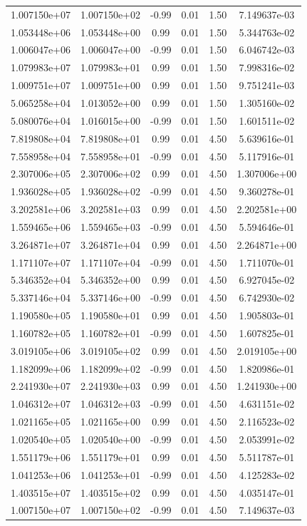 \documentclass{article}
\begin{document}
\begin{table}[htbp]
\begin{tabular}{cccccc}
1.007150e+07 & 1.007150e+02 & -0.99 & 0.01 & 1.50 & 7.149637e-03 \\
1.053448e+06 & 1.053448e+00 & 0.99 & 0.01 & 1.50 & 5.344763e-02 \\
1.006047e+06 & 1.006047e+00 & -0.99 & 0.01 & 1.50 & 6.046742e-03 \\
1.079983e+07 & 1.079983e+01 & 0.99 & 0.01 & 1.50 & 7.998316e-02 \\
1.009751e+07 & 1.009751e+00 & 0.99 & 0.01 & 1.50 & 9.751241e-03 \\
5.065258e+04 & 1.013052e+00 & 0.99 & 0.01 & 1.50 & 1.305160e-02 \\
5.080076e+04 & 1.016015e+00 & -0.99 & 0.01 & 1.50 & 1.601511e-02 \\
7.819808e+04 & 7.819808e+01 & 0.99 & 0.01 & 4.50 & 5.639616e-01 \\
7.558958e+04 & 7.558958e+01 & -0.99 & 0.01 & 4.50 & 5.117916e-01 \\
2.307006e+05 & 2.307006e+02 & 0.99 & 0.01 & 4.50 & 1.307006e+00 \\
1.936028e+05 & 1.936028e+02 & -0.99 & 0.01 & 4.50 & 9.360278e-01 \\
3.202581e+06 & 3.202581e+03 & 0.99 & 0.01 & 4.50 & 2.202581e+00 \\
1.559465e+06 & 1.559465e+03 & -0.99 & 0.01 & 4.50 & 5.594646e-01 \\
3.264871e+07 & 3.264871e+04 & 0.99 & 0.01 & 4.50 & 2.264871e+00 \\
1.171107e+07 & 1.171107e+04 & -0.99 & 0.01 & 4.50 & 1.711070e-01 \\
5.346352e+04 & 5.346352e+00 & 0.99 & 0.01 & 4.50 & 6.927045e-02 \\
5.337146e+04 & 5.337146e+00 & -0.99 & 0.01 & 4.50 & 6.742930e-02 \\
1.190580e+05 & 1.190580e+01 & 0.99 & 0.01 & 4.50 & 1.905803e-01 \\
1.160782e+05 & 1.160782e+01 & -0.99 & 0.01 & 4.50 & 1.607825e-01 \\
3.019105e+06 & 3.019105e+02 & 0.99 & 0.01 & 4.50 & 2.019105e+00 \\
1.182099e+06 & 1.182099e+02 & -0.99 & 0.01 & 4.50 & 1.820986e-01 \\
2.241930e+07 & 2.241930e+03 & 0.99 & 0.01 & 4.50 & 1.241930e+00 \\
1.046312e+07 & 1.046312e+03 & -0.99 & 0.01 & 4.50 & 4.631151e-02 \\
1.021165e+05 & 1.021165e+00 & 0.99 & 0.01 & 4.50 & 2.116523e-02 \\
1.020540e+05 & 1.020540e+00 & -0.99 & 0.01 & 4.50 & 2.053991e-02 \\
1.551179e+06 & 1.551179e+01 & 0.99 & 0.01 & 4.50 & 5.511787e-01 \\
1.041253e+06 & 1.041253e+01 & -0.99 & 0.01 & 4.50 & 4.125283e-02 \\
1.403515e+07 & 1.403515e+02 & 0.99 & 0.01 & 4.50 & 4.035147e-01 \\
1.007150e+07 & 1.007150e+02 & -0.99 & 0.01 & 4.50 & 7.149637e-03 \\
\hline
\end{tabular}
\end{table}
\end{document}
